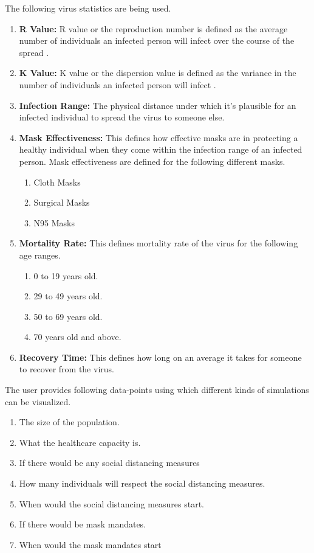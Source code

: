 \documentclass[11pt]{article}
\begin{document}
The following virus statistics are being used.
\begin{enumerate}
    \item \textbf{R Value:} R value or the reproduction number is defined as the average number of individuals an infected person will infect over the course of the spread \cite{r_val}.
    \item \textbf{K Value:} K value or the dispersion value is defined as the variance in the number of individuals an infected person will infect \cite{k_val}.
    \item \textbf{Infection Range:} The physical distance under which it's plausible for an infected individual to spread the virus to someone else.
    \item \textbf{Mask Effectiveness:} This defines how effective masks are in protecting a healthy individual when they come within the infection range of an infected person. Mask effectiveness are defined for the following different masks.
    \begin{enumerate}
        \item Cloth Masks
        \item Surgical Masks
        \item N95 Masks
    \end{enumerate}
    \item \textbf{Mortality Rate:} This defines mortality rate of the virus for the following age ranges.
    \begin{enumerate}
        \item 0 to 19 years old.
        \item 29 to 49 years old.
        \item 50 to 69 years old.
        \item 70 years old and above.
    \end{enumerate}
    \item \textbf{Recovery Time:} This defines how long on an average it takes for someone to recover from the virus.
\end{enumerate}

The user provides following data-points using which different kinds of simulations can be visualized.
\begin{enumerate}
    \item The size of the population.
    \item What the healthcare capacity is.
    \item If there would be any social distancing measures
    \item How many individuals will respect the social distancing measures.
    \item When would the social distancing measures start.
    \item If there would be mask mandates.
    \item When would the mask mandates start
\end{enumerate}
\end{document}
